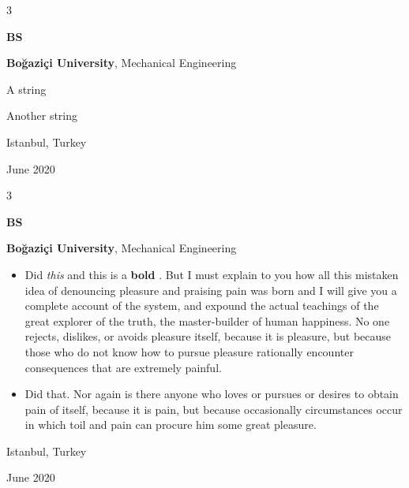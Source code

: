 \documentclass[10pt, letterpaper]{article}
\newenvironment{summary}{
    \begin{description}[
        topsep=0.10 cm,
        parsep=0.10 cm,
        partopsep=0pt,
        itemsep=0pt,
        leftmargin=0.4 cm + 10pt
    ]
}{
    \end{description}
} %
\newenvironment{highlights}{
    \begin{itemize}[
        topsep=0.10 cm,
        parsep=0.10 cm,
        partopsep=0pt,
        itemsep=0pt,
        leftmargin=0.4 cm + 10pt
    ]
}{
    \end{itemize}
} %
\newenvironment{threecolentry}[3][]{
    \onecolentry
    \def\thirdColumn{#3}
    \setcolumnwidth{1 cm, \fill, 4.5 cm}
    \begin{paracol}{3}
    {\raggedright #2} \switchcolumn
}{
    \switchcolumn \raggedleft \thirdColumn
    \end{paracol}
    \endonecolentry
} %
\let\hrefWithoutArrow\href
\renewcommand{\href}[2]{\hrefWithoutArrow{#1}{\ifthenelse{\equal{#2}{}}{ }{#2 }\raisebox{.15ex}{\footnotesize \faExternalLink*}}}
\begin{document}
        \vspace{0.2 cm}

        \begin{threecolentry}{\textbf{BS}}{
            Istanbul, Turkey

        June 2020
        }
            \textbf{Boğaziçi University}, Mechanical Engineering
            \begin{summary}
                \item A string
                \item Another string
            \end{summary}
        \end{threecolentry}

        \vspace{0.2 cm}

        \begin{threecolentry}{\textbf{BS}}{
            Istanbul, Turkey

        June 2020
        }
            \textbf{Boğaziçi University}, Mechanical Engineering
            \begin{highlights}
                \item Did \textit{this} and this is a \textbf{bold} \href{https://example.com}{link}. But I must explain to you how all this mistaken idea of denouncing pleasure and praising pain was born and I will give you a complete account of the system, and expound the actual teachings of the great explorer of the truth, the master-builder of human happiness. No one rejects, dislikes, or avoids pleasure itself, because it is pleasure, but because those who do not know how to pursue pleasure rationally encounter consequences that are extremely painful.
                \item Did that. Nor again is there anyone who loves or pursues or desires to obtain pain of itself, because it is pain, but because occasionally circumstances occur in which toil and pain can procure him some great pleasure.
            \end{highlights}
        \end{threecolentry}

        \vspace{0.2 cm}
\end{document}
